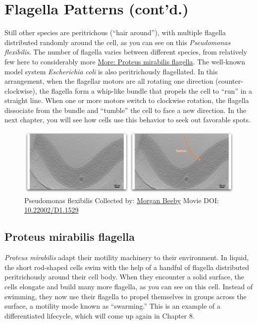 \documentclass[]{tufte-book}
\begin{document}
\section{Flagella Patterns (cont'd.)}\label{flagella-patterns-contd.}

Still other species are peritrichous (``hair around''), with multiple
flagella distributed randomly around the cell, as you can see on this
\emph{Pseudomonas flexibilis}. The number of flagella varies between
different species, from relatively few here to considerably more
\protect\hyperlink{Proteus_mirabilis_flagella}{More: Proteus mirabilis
flagella}. The well-known model system \emph{Escherichia coli} is also
peritrichously flagellated. In this arrangement, when the flagellar
motors are all rotating one direction (counter-clockwise), the flagella
form a whip-like bundle that propels the cell to ``run'' in a straight
line. When one or more motors switch to clockwise rotation, the flagella
dissociate from the bundle and ``tumble'' the cell to face a new
direction. In the next chapter, you will see how cells use this behavior
to seek out favorable spots.





\begin{figure}
\includegraphics{movie_stills/6_5} \caption[Pseudomonas flexibilis Collected by:
\protect\hyperlink{morgan_beeby}{Morgan Beeby} Movie DOI:
\href{https://doi.org/10.22002/D1.1529}{10.22002/D1.1529}]{Pseudomonas flexibilis Collected by:
\protect\hyperlink{morgan_beeby}{Morgan Beeby} Movie DOI:
\href{https://doi.org/10.22002/D1.1529}{10.22002/D1.1529}}\label{fig:6-5}
\end{figure}

\hypertarget{Proteus_mirabilis_flagella}{\subsection{Proteus mirabilis
flagella}\label{Proteus_mirabilis_flagella}}

\emph{Proteus mirabilis} adapt their motility machinery to their
environment. In liquid, the short rod-shaped cells swim with the help of
a handful of flagella distributed peritrichously around their cell body.
When they encounter a solid surface, the cells elongate and build many
more flagella, as you can see on this cell. Instead of swimming, they
now use their flagella to propel themselves in groups across the
surface, a motility mode known as ``swarming.'' This is an example of a
differentiated lifecycle, which will come up again in Chapter 8.
\end{document}
